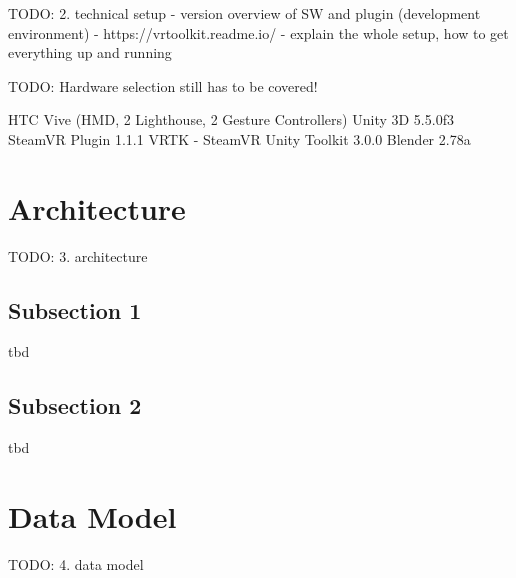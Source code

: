 TODO:
2. technical setup
- version overview of SW and plugin (development environment)
- https://vrtoolkit.readme.io/
- explain the whole setup, how to get everything up and running


TODO: Hardware selection still has to be covered!

HTC Vive (HMD, 2 Lighthouse, 2 Gesture Controllers)
Unity 3D 5.5.0f3		\cite{Unity2016}
SteamVR Plugin 1.1.1		\cite{Valve2016a}
VRTK - SteamVR Unity Toolkit 3.0.0			\cite{Sysdia2017}
Blender 2.78a		\cite{Blender2016}



\section{Architecture}

TODO:
3. architecture





\subsection{Subsection 1}

tbd



\subsection{Subsection 2}

tbd



\section{Data Model}


TODO:
4. data model




